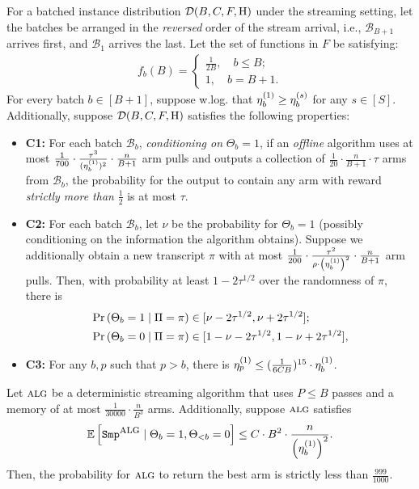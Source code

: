 \begin{proposition}
	\label{prop:multi-pass-lb}
	For a batched instance distribution $\mathcal{D}(B,C,F, \mathrm{H})$ under the streaming setting, let the batches be arranged in the \emph{reversed} order of the stream arrival, i.e., $\mathcal{B}_{B+1}$ arrives first, and $\mathcal{B}_{1}$ arrives the last. Let the set of functions in $F$ be satisfying: 
	\begin{align*}
		f_{b}(B)=
		\begin{cases}
			\frac{1}{2B},\quad b\leq B;\\
			1, \quad b=B+1.
		\end{cases}
	\end{align*}
	For every batch $b\in [B+1]$, suppose w.log. that $\eta^{(1)}_{b}\geq \eta^{(s)}_{b}$ for any $s\in [S]$. Additionally, suppose $\mathcal{D}(B,C,F, \mathrm{H})$ satisfies the following properties:
	\begin{itemize}
		\item \textbf{C1:} For each batch $\mathcal{B}_{b}$, \emph{conditioning on} $\Theta_{b}=1$, if an \emph{offline} algorithm uses at most $\frac{1}{700}\cdot \frac{\tau^3}{(\eta^{(1)}_{b})^2}\cdot \frac{n}{B+1}$ arm pulls and outputs a collection of $\frac{1}{20}\cdot \frac{n}{B+1}\cdot \tau$ arms from $\mathcal{B}_{b}$, the probability for the output to contain any arm with reward \emph{strictly more than} $\frac12$ is at most $\tau$. %
		\item \textbf{C2:} For each batch $\mathcal{B}_{b}$, let $\nu$ be the probability for $\Theta_{b}=1$ (possibly conditioning on the information the algorithm obtains). Suppose we additionally obtain a new transcript $\pi$ with at most $\frac{1}{200}\cdot \frac{\tau^2}{\rho \cdot \left(\eta^{(1)}_{b}\right)^2}\cdot \frac{n}{B+1}$ arm pulls. Then, with probability at least $1-2\tau^{1/2}$ over the randomness of $\pi$, there is
		\begin{align*}
			& \operatorname*{\textnormal{Pr}}\left(\Theta_{b}=1 \mid \Pi=\pi\right) \in [\nu-2 \tau^{1/2}, \nu + 2 \tau^{1/2}];\\
			& \operatorname*{\textnormal{Pr}}\left(\Theta_{b}=0 \mid \Pi=\pi\right) \in [1-\nu-2 \tau^{1/2}, 1-\nu + 2 \tau^{1/2}],
		\end{align*}
		\item \textbf{C3:} For any $b, p$ such that $p>b$, there is $\eta^{(1)}_{p}\leq (\frac{1}{6C B})^{15}\cdot \eta^{(1)}_{b}$.
	\end{itemize}
	Let $\mbox{\sc alg}$ be a deterministic streaming algorithm that uses $P\leq B$ passes and a memory of at most $\frac{1}{30000}\cdot \frac{n}{B^3}$ arms. Additionally, suppose $\mbox{\sc alg}$ satisfies
	\begin{equation}
		\label{equ:batch-sample-ub}
		\operatorname*{{\mathbb{E}}}\left[\mathtt{Smp^{\mbox{\sc alg}}}\mid \Theta_{b}=1, \Theta_{<b}=0\right]\leq C \cdot B^2 \cdot \frac{n}{\left(\eta^{(1)}_{b}\right)^2}.
	\end{equation}
	Then, the probability for $\mbox{\sc alg}$ to return the best arm is strictly less than $\frac{999}{1000}$.
\end{proposition}

